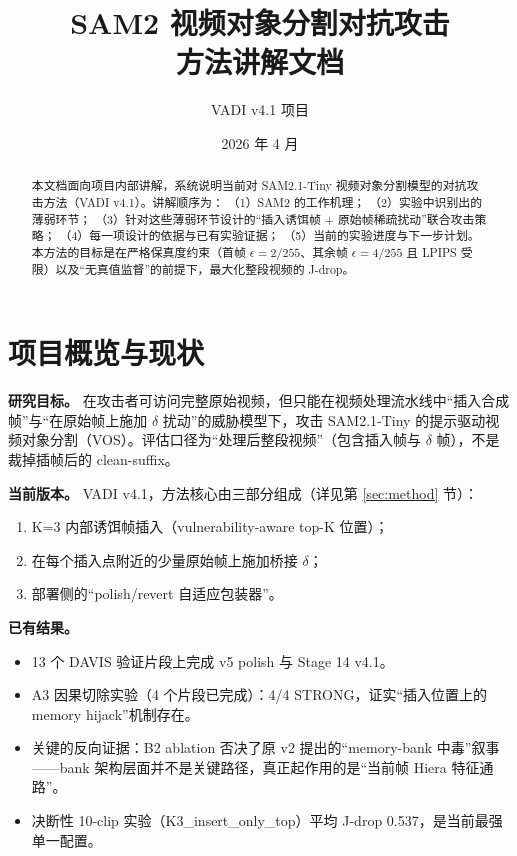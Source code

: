 \documentclass[11pt,a4paper]{ctexart}
\title{SAM2 视频对象分割对抗攻击\\ 方法讲解文档}
\author{VADI v4.1 项目}
\date{2026 年 4 月}
\begin{document}
\maketitle

\begin{abstract}
本文档面向项目内部讲解，系统说明当前对 SAM2.1-Tiny 视频对象分割模型的对抗攻击方法（VADI v4.1）。讲解顺序为：
（1）SAM2 的工作机理；
（2）实验中识别出的薄弱环节；
（3）针对这些薄弱环节设计的``插入诱饵帧 + 原始帧稀疏扰动''联合攻击策略；
（4）每一项设计的依据与已有实验证据；
（5）当前的实验进度与下一步计划。
本方法的目标是在严格保真度约束（首帧 $\epsilon{=}2/255$、其余帧 $\epsilon{=}4/255$ 且 LPIPS 受限）以及``无真值监督''的前提下，最大化整段视频的 J-drop。
\end{abstract}

\tableofcontents

\section{项目概览与现状}
\label{sec:overview}

\textbf{研究目标。} 在攻击者可访问完整原始视频，但只能在视频处理流水线中``插入合成帧''与``在原始帧上施加 $\delta$ 扰动''的威胁模型下，攻击 SAM2.1-Tiny 的提示驱动视频对象分割（VOS）。评估口径为``处理后整段视频''（包含插入帧与 $\delta$ 帧），不是裁掉插帧后的 clean-suffix。

\textbf{当前版本。} VADI v4.1，方法核心由三部分组成（详见第 \ref{sec:method} 节）：
\begin{enumerate}[leftmargin=2em]
    \item K=3 内部诱饵帧插入（vulnerability-aware top-K 位置）；
    \item 在每个插入点附近的少量原始帧上施加桥接 $\delta$；
    \item 部署侧的``polish/revert 自适应包装器''。
\end{enumerate}

\textbf{已有结果。}
\begin{itemize}[leftmargin=2em]
    \item 13 个 DAVIS 验证片段上完成 v5 polish 与 Stage 14 v4.1。
    \item A3 因果切除实验（4 个片段已完成）：4/4 STRONG，证实``插入位置上的 memory hijack''机制存在。
    \item 关键的反向证据：B2 ablation 否决了原 v2 提出的``memory-bank 中毒''叙事——bank 架构层面并不是关键路径，真正起作用的是``当前帧 Hiera 特征通路''。
    \item 决断性 10-clip 实验（K3\_insert\_only\_top）平均 J-drop 0.537，是当前最强单一配置。
\end{itemize}
\end{document}
